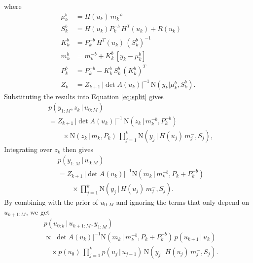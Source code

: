 \documentclass[twocolumn]{autart}    %
\begin{document}
%
where
%
\begin{equation}
\begin{split}
    \mu^b_k &= H(u_k) \, m^{-b}_k \\
      S^b_k &= H(u_k) P^{-b}_k \, H^T(u_k) + R(u_k) \\
      K^b_k &= P^{-b}_k \, H^T(u_k) \, (S^b_k)^{-1} \\
      m^b_k &= m^{-b}_k + K^b_k \, [y_k - \mu^b_k] \\
      P^b_k &= P^{-b}_k - K^b_k \, S^b_k \, (K^b_k)^T \\
        Z_k &= Z_{k+1} \, |\det A(u_k)|^{-1} \,
               \mathrm{N}(y_k | \mu^b_k,S^b_k).
\end{split}
\end{equation}
%
Substituting the results into Equation \eqref{eq:split} gives
%
\begin{equation}
\begin{split}
  &p(y_{1:M},z_k\,|\,u_{0:M}) \\
  &= Z_{k+1} \, |\det A(u_k)|^{-1} \,
  \mathrm{N}(z_{k} \,|\, m^{-b}_{k}, P^{-b}_{k}) \\
  &\qquad \times
  \mathrm{N}(z_k\,|\,m_k,P_k) \,
  \prod_{j=1}^k \mathrm{N}(y_j\,|\,H(u_j) \, m^-_j,S_j),
\end{split}
\end{equation}
%
Integrating over $z_k$ then gives
%
\begin{equation}
\begin{split}
  &p(y_{1:M}\,|\,u_{0:M}) \\
  &= Z_{k+1} \, |\det A(u_k)|^{-1}
  \mathrm{N}(m_k\,|\,m^{-b}_{k},P_k+P^{-b}_{k}) \\
  &\qquad \times
  \prod_{j=1}^k \mathrm{N}(y_j\,|\,H(u_j) \, m^-_j,S_j).
\end{split}
\end{equation}
%
By combining with the prior of $u_{0:M}$ and ignoring the
terms that only depend on $u_{k+1:M}$, we get
%
\begin{equation}
\begin{split}
  &p(u_{0:k}\,|\,u_{k+1:M},y_{1:M}) \\
  &\propto
  |\det A(u_k)|^{-1}
  \mathrm{N}(m_k\,|\,m^{-b}_{k},P_k+P^{-b}_{k}) \, p(u_{k+1}\,|\,u_{k}) \\
  &\quad \times
  p(u_0) \,
  \prod_{j=1}^k p(u_{j}\,|\,u_{j-1}) \,
  \mathrm{N}(y_j\,|\,H(u_j) \, m^-_j,S_j).
\end{split}
\end{equation}
\end{document}
